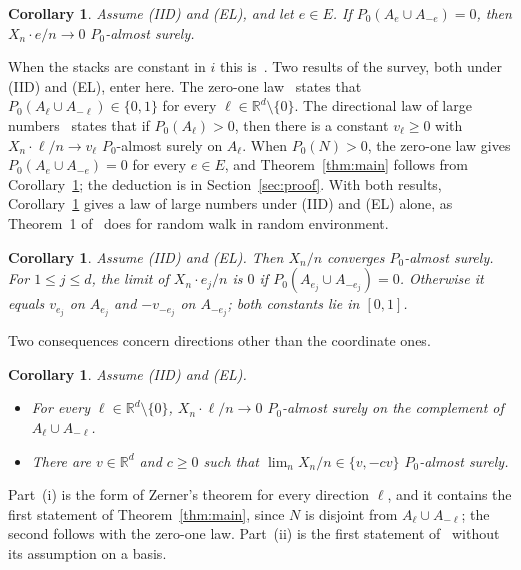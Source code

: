 \documentclass[11pt]{amsart}
\newtheorem{corollary}[theorem]{Corollary}
\theoremstyle{remark}
\newcommand{\R}{\mathbb{R}}
\begin{document}
\begin{corollary}\label{cor:zerner}
Assume (IID) and (EL), and let $e\in E$. If $P_0(A_e\cup A_{-e})=0$, then $X_n\cdot e/n\to0$ $P_0$-almost surely.
\end{corollary}

When the stacks are constant in $i$ this is~\cite[Theorem 1]{Zer02}. Two results of the survey, both under (IID) and
(EL), enter here. The zero-one law~\cite[Theorem 3.16]{KZ13} states that $P_0(A_\ell\cup A_{-\ell})\in\{0,1\}$ for every
$\ell\in\R^d\setminus\{0\}$. The directional law of large numbers~\cite[Theorem 4.6]{KZ13} states that if
$P_0(A_\ell)>0$, then there is a constant $v_\ell\ge0$ with $X_n\cdot\ell/n\to v_\ell$ $P_0$-almost surely on $A_\ell$.
When $P_0(N)>0$, the zero-one law gives $P_0(A_e\cup A_{-e})=0$ for every $e\in E$, and Theorem~\ref{thm:main} follows
from Corollary~\ref{cor:zerner}; the deduction is in Section~\ref{sec:proof}. With both results,
Corollary~\ref{cor:zerner} gives a law of large numbers under (IID) and (EL) alone, as Theorem~1 of~\cite{Zer02} does
for random walk in random environment.

\begin{corollary}\label{cor:lln}
Assume (IID) and (EL). Then $X_n/n$ converges $P_0$-almost surely. For \mbox{$1\le j\le d$}, the limit of
$X_n\cdot e_j/n$ is $0$ if $P_0(A_{e_j}\cup A_{-e_j})=0$. Otherwise it equals $v_{e_j}$ on $A_{e_j}$ and $-v_{-e_j}$ on
$A_{-e_j}$; both constants lie in $[0,1]$.
\end{corollary}

Two consequences concern directions other than the coordinate ones.

\begin{corollary}\label{cor:direction}
Assume (IID) and (EL).
\begin{itemize}
\item[(i)] For every $\ell\in\R^d\setminus\{0\}$, $X_n\cdot\ell/n\to0$ $P_0$-almost surely on the complement of
$A_\ell\cup A_{-\ell}$.
\item[(ii)] There are $v\in\R^d$ and $c\ge0$ such that $\lim_nX_n/n\in\{v,-cv\}$ $P_0$-almost surely.
\end{itemize}
\end{corollary}

Part~(i) is the form of Zerner's theorem for every direction $\ell$, and it contains the first statement of
Theorem~\ref{thm:main}, since $N$ is disjoint from $A_\ell\cup A_{-\ell}$; the second follows with the zero-one law. Part~(ii) is the first statement of~\cite[Theorem 4.8]{KZ13} without its
assumption on a basis.
\end{document}
